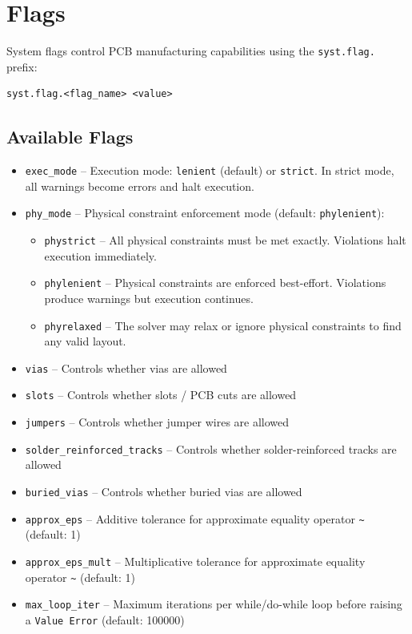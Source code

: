 \chapter{Flags}
\label{ch:flags}
System flags control PCB manufacturing capabilities using the \texttt{syst.flag.} prefix:
\begin{verbatim}
syst.flag.<flag_name> <value>
\end{verbatim}

\section{Available Flags}
\begin{itemize}
\item \texttt{exec\_mode} -- Execution mode: \texttt{lenient} (default) or \texttt{strict}. In strict mode, all warnings become errors and halt execution.
\item \texttt{phy\_mode} -- Physical constraint enforcement mode (default: \texttt{phylenient}):
\begin{itemize}
\item \texttt{phystrict} -- All physical constraints must be met exactly. Violations halt execution immediately.
\item \texttt{phylenient} -- Physical constraints are enforced best-effort. Violations produce warnings but execution continues.
\item \texttt{phyrelaxed} -- The solver may relax or ignore physical constraints to find any valid layout.
\end{itemize}
\item \texttt{vias} -- Controls whether vias are allowed
\item \texttt{slots} -- Controls whether slots / PCB cuts are allowed
\item \texttt{jumpers} -- Controls whether jumper wires are allowed
\item \texttt{solder\_reinforced\_tracks} -- Controls whether solder-reinforced tracks are allowed
\item \texttt{buried\_vias} -- Controls whether buried vias are allowed
\item \texttt{approx\_eps} -- Additive tolerance for approximate equality operator \texttt{\textasciitilde} (default: 1)
\item \texttt{approx\_eps\_mult} -- Multiplicative tolerance for approximate equality operator \texttt{\textasciitilde*} (default: 1)
\item \texttt{max\_loop\_iter} -- Maximum iterations per while/do-while loop before raising a \texttt{Value Error} (default: 100000)

\end{itemize}
